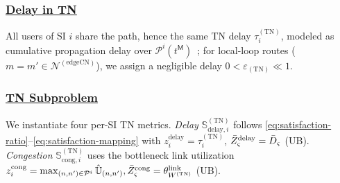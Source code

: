 \documentclass[12pt,lettersize,journal,onecolumn]{IEEEtran}
\begin{document}
\subsubsection{\underline{Delay in TN}}\label{tn-delay-subsection}
All users of SI $i$ share the path, hence the same TN delay $\tau^{\mathrm{(TN)}}_{i}$, modeled as cumulative propagation delay over $\mathcal{P}^{i}(t^\mathsf{M})$~\cite{tnse25nouruzi}; for local-loop routes ($m=m'\in\mathcal{N}^{(\text{edgeCN})}$), we assign a negligible delay $0<\varepsilon_{\mathrm{(TN)}}\ll1$.

\subsubsection{\underline{TN Subproblem}}\label{tn-problem-formulation}
We instantiate four per-SI TN metrics. \textit{Delay} $\mathbb{S}^{\mathrm{(TN)}}_{\mathrm{delay},i}$ follows \eqref{eq:satisfaction-ratio}--\eqref{eq:satisfaction-mapping} with $z^{\mathrm{delay}}_{i}=\tau^{\mathrm{(TN)}}_{i}$, $\Bar{Z}^{\mathrm{delay}}_{\varsigma}=\Bar{D}_{\varsigma}$ (UB). \textit{Congestion} $\mathbb{S}^{\mathrm{(TN)}}_{\mathrm{cong},i}$ uses the bottleneck link utilization $z^{\mathrm{cong}}_{i}=\max_{(n,n')\in\mathcal{P}^{i}}\mathbb{\Hat{U}}_{(n,n')},  \Bar{Z}^{\mathrm{cong}}_{\varsigma}=\theta_{W^{(\mathrm{TN})}}^{\text{link}}$ (UB). %
\end{document}
